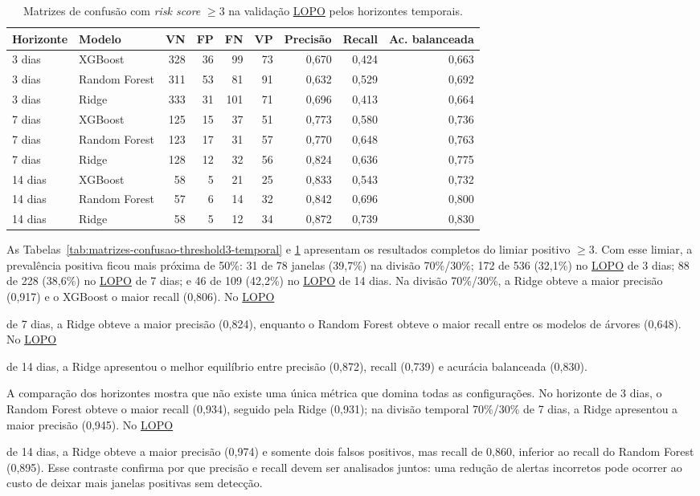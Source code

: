 \documentclass[12pt,a4paper]{article}
\DeclareRobustCommand{\sigla}[1]{%
    \texorpdfstring{\hyperlink{sigla:#1}{#1}}{#1}%
}
\begin{document}
\begin{table}[H]
    \centering
    \caption{Matrizes de confusão com \textit{risk score} $\geq 3$ na validação
    \sigla{LOPO} pelos horizontes temporais.}
    \label{tab:matrizes-confusao-threshold3-lopo}
    \small
    \begin{tabular}{llrrrrrrr}
        \toprule
        Horizonte & Modelo & VN & FP & FN & VP & Precisão & Recall & Ac. balanceada \\
        \midrule
        3 dias & XGBoost & 328 & 36 & 99 & 73 & 0,670 & 0,424 & 0,663 \\
        3 dias & Random Forest & 311 & 53 & 81 & 91 & 0,632 & 0,529 & 0,692 \\
        3 dias & Ridge & 333 & 31 & 101 & 71 & 0,696 & 0,413 & 0,664 \\
        7 dias & XGBoost & 125 & 15 & 37 & 51 & 0,773 & 0,580 & 0,736 \\
        7 dias & Random Forest & 123 & 17 & 31 & 57 & 0,770 & 0,648 & 0,763 \\
        7 dias & Ridge & 128 & 12 & 32 & 56 & 0,824 & 0,636 & 0,775 \\
        14 dias & XGBoost & 58 & 5 & 21 & 25 & 0,833 & 0,543 & 0,732 \\
        14 dias & Random Forest & 57 & 6 & 14 & 32 & 0,842 & 0,696 & 0,800 \\
        14 dias & Ridge & 58 & 5 & 12 & 34 & 0,872 & 0,739 & 0,830 \\
        \bottomrule
    \end{tabular}
\end{table}

As Tabelas~\ref{tab:matrizes-confusao-threshold3-temporal} e
\ref{tab:matrizes-confusao-threshold3-lopo} apresentam os resultados completos
do limiar positivo $\geq 3$. Com esse limiar, a prevalência positiva ficou mais próxima de
50\%: 31 de 78 janelas (39,7\%) na divisão 70\%/30\%; 172 de 536 (32,1\%) no
\sigla{LOPO} de 3 dias; 88 de 228 (38,6\%) no \sigla{LOPO} de 7 dias; e 46 de
109 (42,2\%) no \sigla{LOPO} de 14 dias. Na divisão 70\%/30\%, a Ridge obteve
a maior precisão (0,917) e o XGBoost o maior recall (0,806). No \sigla{LOPO}
de 7 dias, a Ridge obteve a maior precisão (0,824), enquanto o Random Forest
obteve o maior recall entre os modelos de árvores (0,648). No \sigla{LOPO}
de 14 dias, a Ridge apresentou o melhor equilíbrio entre precisão (0,872),
recall (0,739) e acurácia balanceada (0,830).

A comparação dos horizontes mostra que não existe uma única métrica que
domina todas as configurações. No horizonte de 3 dias, o Random Forest obteve
o maior recall (0,934), seguido pela Ridge (0,931); na divisão temporal
70\%/30\% de 7 dias, a Ridge apresentou a maior precisão (0,945). No \sigla{LOPO}
de 14 dias, a Ridge obteve a maior precisão (0,974) e somente dois falsos
positivos, mas recall de 0,860, inferior ao recall do Random Forest (0,895).
Esse contraste confirma por que precisão e recall devem ser analisados juntos:
uma redução de alertas incorretos pode ocorrer ao custo de deixar mais
janelas positivas sem detecção.
\end{document}
